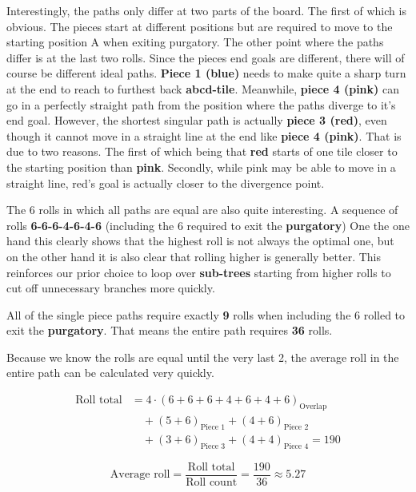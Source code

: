 \documentclass[12pt]{article}
\begin{document}
\newpage
Interestingly, the paths only differ at two parts of the board. The first of which is obvious. The pieces start at different positions but are required to move to the starting position A when exiting purgatory. The other point where the paths differ is at the last two rolls. Since the pieces end goals are different, there will of course be different ideal paths. \textbf{Piece 1 (blue)} needs to make quite a sharp turn at the end to reach to furthest back \textbf{abcd-tile}. Meanwhile, \textbf{piece 4 (pink)} can go in a perfectly straight path from the position where the paths diverge to it's end goal. However, the shortest singular path is actually \textbf{piece 3 (red)}, even though it cannot move in a straight line at the end like \textbf{piece 4 (pink)}. That is due to two reasons. The first of which being that \textbf{red} starts of one tile closer to the starting position than \textbf{pink}. Secondly, while pink may be able to move in a straight line, red's goal is actually closer to the divergence point.

The 6 rolls in which all paths are equal are also quite interesting. A sequence of rolls \textbf{6-6-6-4-6-4-6} (including the 6 required to exit the \textbf{purgatory}) One the one hand this clearly shows that the highest roll is not always the optimal one, but on the other hand it is also clear that rolling higher is generally better. This reinforces our prior choice to loop over \textbf{sub-trees} starting from higher rolls to cut off unnecessary branches more quickly.

All of the single piece paths require exactly \textbf{9} rolls when including the 6 rolled to exit the \textbf{purgatory}. That means the entire path requires \textbf{36} rolls.

Because we know the rolls are equal until the very last 2, the average roll in the entire path can be calculated very quickly.

\begin{align*}
    \text{Roll total} &= 4 \cdot \left( 6+6+6+4+6+4+6 \right)_{\text{Overlap}} \\
    &\quad + \left( 5+6 \right)_{\text{Piece 1}} + \left( 4+6 \right)_{\text{Piece 2}} \\
    &\quad + \left( 3+6 \right)_{\text{Piece 3}} + \left( 4+4 \right)_{\text{Piece 4}} = 190
\end{align*}

\[
	\text{Average roll} =  \frac{\text{Roll total}}{\text{Roll count}} = \frac{190}{36} \approx 5.27
\]
\end{document}
